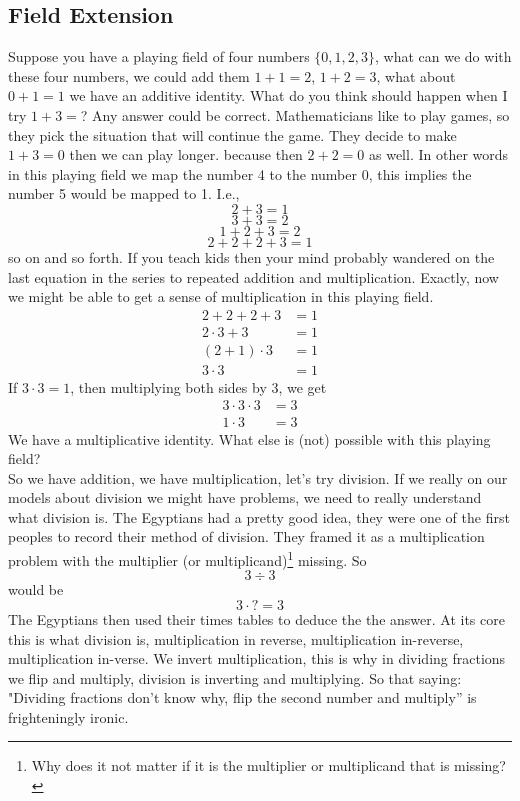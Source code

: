 \documentclass[12pt]{article}
\begin{document}
\subsection*{Field Extension}
Suppose you have a playing field of four numbers $\{0, 1, 2, 3\}$, what can we do with these four numbers, we could add them $1+1=2$, $1+2=3$, what about $0+1=1$  we have an additive identity.  What do you think should happen when I try $1+3=$?  Any answer could be correct.  Mathematicians like to play games, so they pick the situation that will continue the game.  They decide to make $1+3=0$ then we can play longer. because then $2+2=0$ as well.  In other words in this playing field we map the number 4 to the number 0, this implies the number 5 would be mapped to 1.  I.e., $$2+3=1$$ $$3+3=2$$ $$1+2+3=2$$ $$2+2+2+3=1$$ so on and so forth.  If you teach kids then your mind probably wandered on the last equation in the series to repeated addition and multiplication.  Exactly, now we might be able to get a sense of multiplication in this playing field.
\begin{align*}
2+2+2+3 &=1 \\
2 \cdot 3 +3 &= 1 \\
(2+1) \cdot 3 &= 1 \\
3 \cdot 3 &= 1
\end{align*}
If $3 \cdot 3 = 1$, then multiplying both sides by 3, we get
\begin{align*}
3 \cdot 3 \cdot 3 &= 3 \\
1 \cdot 3 &= 3
\end{align*}
We have a multiplicative identity.  What else is (not) possible with this playing field?\\

So we have addition, we have multiplication, let's try division.  If we really on our models about division we might have problems, we need to really understand what division is.  The Egyptians had a pretty good idea, they were one of the first peoples to record their method of division.  They framed it as a multiplication problem with the multiplier (or multiplicand)\footnote{Why does it not matter if it is the multiplier or multiplicand that is missing?} missing. So $$3 \div 3$$ would be $$3 \cdot ? = 3$$  
The Egyptians then used their times tables to deduce the the answer.  At its core this is what division is, multiplication in reverse, multiplication in-reverse, multiplication in-verse.  We invert multiplication, this is why in dividing fractions we flip and multiply, division is inverting and multiplying.  So that saying: "Dividing fractions don't know why, flip the second number and multiply'' is frighteningly ironic.\\
\end{document}
